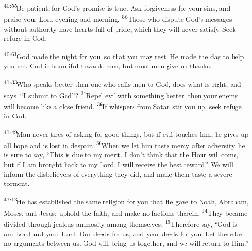 \documentclass[openany,12pt,english]{book}
\newenvironment{para}{\par\pretolerance=100\tolerance=200\setlength{\emergencystretch}{0.6em}\relax}{\par}
\begin{document}
\bigskip{}

\begin{para}
    \textsuperscript{40:55}\thinspace{}Be pa\-tient, for God's prom\-ise is true. Ask for\-give\-ness for your sins, and praise your Lord eve\-ning and morn\-ing.
    \textsuperscript{56}\thinspace{}Those who dis\-pute God's messages with\-out au\-thor\-i\-ty have hearts full of pride, which they will nev\-er sat\-is\-fy. Seek ref\-uge in God.
\end{para}

\begin{para}
    \textsuperscript{40:61}\thinspace{}God made the night for you, so that you may rest. He made the day to help you see. God is boun\-ti\-ful to\-wards men, but most men give no thanks.
\end{para}

\bigskip{}

\begin{para}
    \textsuperscript{41:33}\thinspace{}Who speaks bet\-ter than one who calls men to God, does what is right, and says, “I sub\-mit to God”?
    \textsuperscript{34}\thinspace{}Re\-pel evil with some\-thing bet\-ter, then your en\-e\-my will be\-come like a close friend.
    \textsuperscript{36}\thinspace{}If whispers from Satan stir you up, seek ref\-uge in God.
\end{para}

\begin{para}
    \textsuperscript{41:49}\thinspace{}Man nev\-er tires of asking for good things, but if evil touches him, he gives up all hope and is lost in de\-spair.
    \textsuperscript{50}\thinspace{}When we let him taste mer\-cy af\-ter ad\-ver\-si\-ty, he is sure to say, “This is due to my mer\-it. I don't think that the Hour will come, but if I am brought back to my Lord, I will re\-ceive the best re\-ward.” We will in\-form the disbelievers of eve\-ry\-thing they did, and make them taste a se\-vere tor\-ment.
\end{para}

\bigskip{}

\begin{para}
    \textsuperscript{42:13}\thinspace{}He has established the same re\-li\-gion for you that He gave to No\-ah, Abraham, Mo\-ses, and Jesus: up\-hold the faith, and make no factions there\-in.
    \textsuperscript{14}\thinspace{}They be\-came di\-vid\-ed through jeal\-ous an\-i\-mos\-i\-ty a\-mong them\-selves.
    \textsuperscript{15}\thinspace{}There\-fore say, “God is our Lord and your Lord. Our deeds for us, and your deeds for you. Let there be no arguments be\-tween us. God will bring us to\-geth\-er, and we will re\-turn to Him.”
\end{para}
\end{document}
